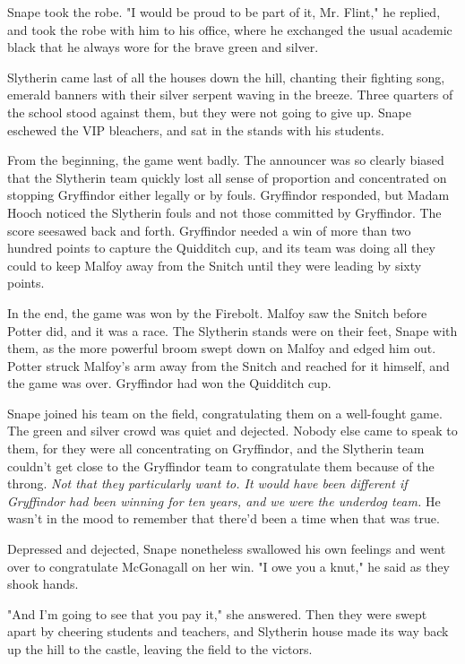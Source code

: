 Snape took the robe. "I would be proud to be part of it, Mr. Flint," he replied, and took the robe with him to his office, where he exchanged the usual academic black that he always wore for the brave green and silver.

Slytherin came last of all the houses down the hill, chanting their fighting song, emerald banners with their silver serpent waving in the breeze. Three quarters of the school stood against them, but they were not going to give up. Snape eschewed the VIP bleachers, and sat in the stands with his students.

From the beginning, the game went badly. The announcer was so clearly biased that the Slytherin team quickly lost all sense of proportion and concentrated on stopping Gryffindor either legally or by fouls. Gryffindor responded, but Madam Hooch noticed the Slytherin fouls and not those committed by Gryffindor. The score seesawed back and forth. Gryffindor needed a win of more than two hundred points to capture the Quidditch cup, and its team was doing all they could to keep Malfoy away from the Snitch until they were leading by sixty points.

In the end, the game was won by the Firebolt. Malfoy saw the Snitch before Potter did, and it was a race. The Slytherin stands were on their feet, Snape with them, as the more powerful broom swept down on Malfoy and edged him out. Potter struck Malfoy's arm away from the Snitch and reached for it himself, and the game was over. Gryffindor had won the Quidditch cup.

Snape joined his team on the field, congratulating them on a well-fought game. The green and silver crowd was quiet and dejected. Nobody else came to speak to them, for they were all concentrating on Gryffindor, and the Slytherin team couldn't get close to the Gryffindor team to congratulate them because of the throng. \emph{Not that they particularly want to. It would have been different if Gryffindor had been winning for ten years, and we were the underdog team. }He wasn't in the mood to remember that there'd been a time when that was true.

Depressed and dejected, Snape nonetheless swallowed his own feelings and went over to congratulate McGonagall on her win. "I owe you a knut," he said as they shook hands.

"And I'm going to see that you pay it," she answered. Then they were swept apart by cheering students and teachers, and Slytherin house made its way back up the hill to the castle, leaving the field to the victors.

\sbreak


